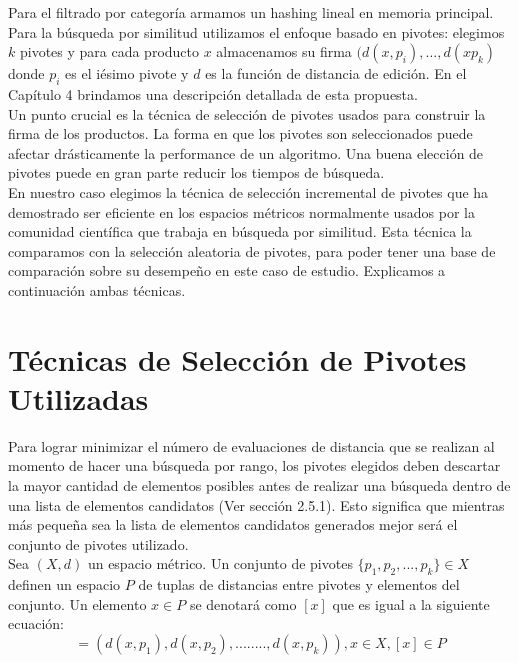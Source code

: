 Para el filtrado por categor\'ia armamos un hashing lineal en memoria principal. Para la búsqueda por similitud utilizamos el enfoque basado en pivotes: elegimos $k$ pivotes y para cada producto $x$ almacenamos su firma $(d(x,p_i), \ldots, d(xp_k)$ donde $p_i$ es el i\'esimo pivote y $d$ es la funci\'on de distancia de edici\'on. En el Cap\'itulo 4 brindamos una descripci\'on detallada de esta propuesta.\\
 
Un punto crucial es la t\'ecnica de selecci\'on de pivotes usados para construir la firma de los productos. La forma en que los pivotes son seleccionados puede afectar dr\'asticamente la performance de un algoritmo. Una buena elecci\'on de pivotes puede en gran parte reducir los tiempos de b\'usqueda.\\
 
En nuestro caso elegimos la t\'ecnica de selecci\'on incremental de pivotes \cite{BNCsccc01} que ha demostrado ser eficiente en los espacios m\'etricos  normalmente usados por la comunidad cient\'ifica que trabaja en b\'usqueda por similitud. Esta t\'ecnica la comparamos con la selecci\'on aleatoria de pivotes, para poder tener una base de comparaci\'on sobre su desempeño en este caso de estudio. Explicamos a continuaci\'on ambas t\'ecnicas.\\
 
\section{T\'ecnicas de Selecci\'on de Pivotes Utilizadas}

Para lograr minimizar el n\'umero de evaluaciones de distancia que se realizan al momento de hacer una b\'usqueda por rango, los pivotes elegidos deben descartar la mayor cantidad de elementos posibles antes de realizar una b\'usqueda dentro de una lista de elementos candidatos (Ver secci\'on 2.5.1). Esto significa que mientras más peque\~na sea la lista de elementos candidatos generados mejor ser\'a el conjunto de pivotes utilizado. \\

Sea $(X,d)$ un espacio m\'etrico. Un conjunto de pivotes $\{p_1,p_2,...,p_k\} \in X$ definen un espacio $P$ de tuplas de distancias entre pivotes y elementos del conjunto. Un elemento $x \in P$ se denotar\'a como $[x]$ que es igual a la siguiente ecuaci\'on:\\

\begin{equation}
[x] = (d(x,p_1),d(x,p_2),........,d(x,p_k)), x \in X, [x] \in P
\label{eq-mapeo}
\end{equation}
\\

